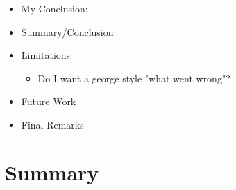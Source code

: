\begin{itemize}
    \item My Conclusion:
    \item Summary/Conclusion
    \item Limitations
    \begin{itemize}
        \item Do I want a george style "what went wrong"?
    \end{itemize}
    \item Future Work
    \item Final Remarks
\end{itemize}
\fi

\section{Summary}\label{conc_sec:summary}

